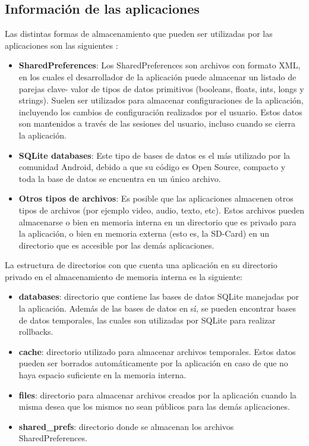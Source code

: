 \subsection{Información de las aplicaciones}
Las distintas formas de almacenamiento que pueden ser utilizadas por las aplicaciones son las siguientes \cite{androidStrg}:

\begin{itemize}
\item \textbf{SharedPreferences}: Los SharedPreferences son archivos con formato XML, en los cuales el desarrollador de la aplicación puede almacenar un listado de parejas clave- valor de tipos de datos primitivos (booleans, floats, ints, longs y strings). Suelen ser utilizados para almacenar configuraciones de la aplicación, incluyendo los cambios de configuración realizados por el usuario. Estos datos son mantenidos a través de las sesiones del usuario, incluso cuando se cierra la aplicación. 
\item \textbf{SQLite databases}: Este tipo de bases de datos es el más utilizado por la comunidad Android, debido a que su código es Open Source, compacto y toda la base de datos se encuentra en un único archivo. 
\item \textbf{Otros tipos de archivos}: Es posible que las aplicaciones almacenen otros tipos de archivos (por ejemplo video, audio, texto, etc). Estos archivos pueden almacenarse o bien en memoria interna en un directorio que es privado para la aplicación, o bien en memoria externa (esto es, la SD-Card) en un directorio que es accesible por las demás aplicaciones.
\end{itemize}

La estructura de directorios con que cuenta una aplicación en su directorio privado en el almacenamiento de memoria interna es la siguiente:

\begin{itemize}
\item \textbf{databases}: directorio que contiene las bases de datos SQLite manejadas por la aplicación. Además de las bases de datos en sí, se pueden encontrar bases de datos temporales, las cuales son utilizadas por SQLite para realizar rollbacks.
\item \textbf{cache}: directorio utilizado para almacenar archivos temporales. Estos datos pueden ser borrados automáticamente por la aplicación en caso de que no haya espacio suficiente en la memoria interna.
\item \textbf{files}: directorio para almacenar archivos creados por la aplicación cuando la misma desea que los mismos no sean públicos para las demás aplicaciones.
\item \textbf{shared\_prefs}: directorio donde se almacenan los archivos SharedPreferences.
\end{itemize}

